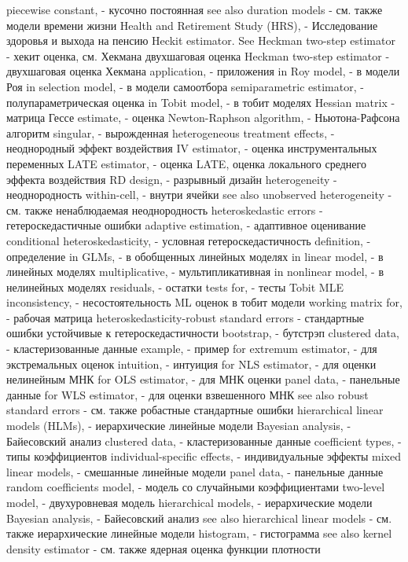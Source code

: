 piecewise constant,  - кусочно постоянная
see also duration models - см. также модели времени жизни
Health and Retirement Study (HRS), - Исследование здоровья и выхода на пенсию
Heckit estimator. See Heckman two-step estimator - хекит оценка, см. Хекмана двухшаговая оценка
Heckman two-step estimator - двухшаговая оценка Хекмана
application, - приложения
in Roy model, - в модели Роя
in selection model, - в модели самоотбора
semiparametric estimator, - полупараметрическая оценка
in Tobit model, - в тобит моделях
Hessian matrix - матрица Гессе
estimate, - оценка
Newton-Raphson algorithm, - Ньютона-Рафсона алгоритм
singular, - вырожденная
heterogeneous treatment effects, - неоднородный эффект воздействия
IV estimator, - оценка инструментальных переменных
LATE estimator, - оценка LATE, оценка локального среднего эффекта воздействия
RD design, - разрывный дизайн
heterogeneity - неоднородность
within-cell, - внутри ячейки
see also unobserved heterogeneity - см. также ненаблюдаемая неоднородность
heteroskedastic errors - гетероскедастичные ошибки
adaptive estimation, - адаптивное оценивание
conditional heteroskedasticity, - условная гетероскедастичность
definition, - определение
in GLMs, - в обобщенных линейных моделях
in linear model, - в линейных моделях
multiplicative, - мультипликативная
in nonlinear model, - в нелинейных моделях
residuals, - остатки
tests for, - тесты
Tobit MLE inconsistency, - несостоятельность ML оценок в тобит модели
working matrix for, - рабочая матрица
heteroskedasticity-robust standard errors - стандартные ошибки устойчивые к гетероскедастичности
bootstrap, - бутстрэп
clustered data, - кластеризованные данные
example, - пример
for extremum estimator, - для экстремальных оценок
intuition, - интуиция
for NLS estimator, - для оценки нелинейным МНК
for OLS estimator, - для МНК оценки
panel data, - панельные данные
for WLS estimator, - для оценки взвешенного МНК
see also robust standard errors - см. также робастные стандартные ошибки
hierarchical linear models (HLMs), - иерархические линейные модели
Bayesian analysis, - Байесовский анализ
clustered data, - кластеризованные данные
coefficient types, - типы коэффициентов
individual-specific effects, - индивидуальные эффекты
mixed linear models, - смешанные линейные модели
panel data, - панельные данные
random coefficients model, - модель со случайными коэффициентами
two-level model, - двухуровневая модель
hierarchical models, - иерархические модели
Bayesian analysis, - Байесовский анализ
see also hierarchical linear models - см. также иерархические линейные модели
histogram, - гистограмма
see also kernel density estimator - см. также ядерная оценка функции плотности

